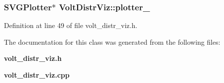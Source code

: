\subsubsection[{plotter\-\_\-}]{\setlength{\rightskip}{0pt plus 5cm}\-S\-V\-G\-Plotter$\ast$ {\bf \-Volt\-Distr\-Viz\-::plotter\-\_\-}\hspace{0.3cm}{\ttfamily  [private]}}\label{classVoltDistrViz_a35a429c09c9ac71c2bd8781e88eb3470}


\-Definition at line 49 of file volt\-\_\-distr\-\_\-viz.\-h.



\-The documentation for this class was generated from the following files\-:\begin{DoxyCompactItemize}
\item 
{\bf volt\-\_\-distr\-\_\-viz.\-h}\item 
{\bf volt\-\_\-distr\-\_\-viz.\-cpp}\end{DoxyCompactItemize}
